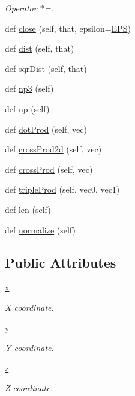 \begin{DoxyCompactItemize}
\begin{DoxyCompactList}\small\item\em Operator $\ast$=. \end{DoxyCompactList}\item 
def \hyperlink{classgeometry_1_1Point_ab9ec6d1fd080ba8b7eb99e5832505c85}{close} (self, that, epsilon=\hyperlink{namespacegeometry_a543db87a5e9af9e1d17146559a540276}{E\+PS})
\item 
def \hyperlink{classgeometry_1_1Point_a8da689422b3b004369e1467f8123e8a7}{dist} (self, that)
\item 
def \hyperlink{classgeometry_1_1Point_a28f393df5b0c4a297157a3ae55f1f4a3}{sqr\+Dist} (self, that)
\item 
def \hyperlink{classgeometry_1_1Point_a12ce9dea666d1b40218822a89bada540}{np3} (self)
\item 
def \hyperlink{classgeometry_1_1Point_a133d82361f16f975fcb232ba41ff5562}{np} (self)
\item 
def \hyperlink{classgeometry_1_1Point_a4df6e13ff003843f967090fb7f51cc85}{dot\+Prod} (self, vec)
\item 
def \hyperlink{classgeometry_1_1Point_ae6747fdae2c6ec09961298171862ef4b}{cross\+Prod2d} (self, vec)
\item 
def \hyperlink{classgeometry_1_1Point_aa9a3448e0da24f3132a4ccc7abf191a7}{cross\+Prod} (self, vec)
\item 
def \hyperlink{classgeometry_1_1Point_acce6c690969f757d26e4a544955cb8f4}{triple\+Prod} (self, vec0, vec1)
\item 
def \hyperlink{classgeometry_1_1Point_ae6b226778d9c084c9369faa6dfd95398}{len} (self)
\item 
def \hyperlink{classgeometry_1_1Point_a902f60cc3736617d3846e137a1efef80}{normalize} (self)
\end{DoxyCompactItemize}
\subsection*{Public Attributes}
\begin{DoxyCompactItemize}
\item 
\hyperlink{classgeometry_1_1Point_a98f21eef44d1c182f04f1262c90815fc}{x}
\begin{DoxyCompactList}\small\item\em X coordinate. \end{DoxyCompactList}\item 
\hyperlink{classgeometry_1_1Point_a4ef9a436e11219296ba5e3fff9e87711}{y}
\begin{DoxyCompactList}\small\item\em Y coordinate. \end{DoxyCompactList}\item 
\hyperlink{classgeometry_1_1Point_afd1ce6427fa3e28c9c42934bb5d76165}{z}
\begin{DoxyCompactList}\small\item\em Z coordinate. \end{DoxyCompactList}\end{DoxyCompactItemize}


